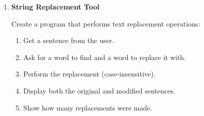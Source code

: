 \documentclass[a4paper,11pt]{article}
\theoremstyle{mytheor}
\begin{document}
\begin{enumerate}
    
    






    \item \textbf{String Replacement Tool}
    
    Create a program that performs text replacement operations:
    \begin{enumerate} 
        \item Get a sentence from the user.
        \item Ask for a word to find and a word to replace it with.
        \item Perform the replacement (case-insensitive).
        \item Display both the original and modified sentences.
        \item Show how many replacements were made.
    \end{enumerate}
    

\end{enumerate}
\end{document}
